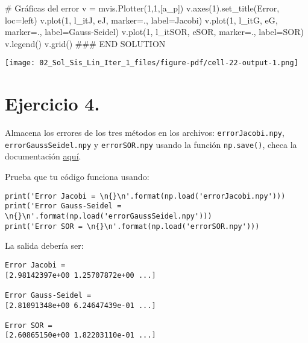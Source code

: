 \documentclass[
  letterpaper,
  DIV=11,
  numbers=noendperiod]{scrreprt}
\newenvironment{Shaded}{\begin{snugshade}}{\end{snugshade}}
\newcommand{\CommentTok}[1]{\textcolor[rgb]{0.37,0.37,0.37}{#1}}
\newcommand{\DecValTok}[1]{\textcolor[rgb]{0.68,0.00,0.00}{#1}}
\newcommand{\NormalTok}[1]{\textcolor[rgb]{0.00,0.23,0.31}{#1}}
\newcommand{\OperatorTok}[1]{\textcolor[rgb]{0.37,0.37,0.37}{#1}}
\newcommand{\RegionMarkerTok}[1]{\textcolor[rgb]{0.00,0.23,0.31}{#1}}
\newcommand{\StringTok}[1]{\textcolor[rgb]{0.13,0.47,0.30}{#1}}
\begin{document}
\begin{Shaded}
\begin{Highlighting}[]
\CommentTok{\# Gráficas del error}
\NormalTok{v }\OperatorTok{=}\NormalTok{ mvis.Plotter(}\DecValTok{1}\NormalTok{,}\DecValTok{1}\NormalTok{,[a\_p]) }
\NormalTok{v.axes(}\DecValTok{1}\NormalTok{).set\_title(}\StringTok{\textquotesingle{}Error\textquotesingle{}}\NormalTok{, loc}\OperatorTok{=}\StringTok{\textquotesingle{}left\textquotesingle{}}\NormalTok{)}
\NormalTok{v.plot(}\DecValTok{1}\NormalTok{, l\_itJ, eJ, marker}\OperatorTok{=}\StringTok{\textquotesingle{}.\textquotesingle{}}\NormalTok{, label}\OperatorTok{=}\StringTok{\textquotesingle{}Jacobi\textquotesingle{}}\NormalTok{)}
\NormalTok{v.plot(}\DecValTok{1}\NormalTok{, l\_itG, eG, marker}\OperatorTok{=}\StringTok{\textquotesingle{}.\textquotesingle{}}\NormalTok{, label}\OperatorTok{=}\StringTok{\textquotesingle{}Gauss{-}Seidel\textquotesingle{}}\NormalTok{)}
\NormalTok{v.plot(}\DecValTok{1}\NormalTok{, l\_itSOR, eSOR, marker}\OperatorTok{=}\StringTok{\textquotesingle{}.\textquotesingle{}}\NormalTok{, label}\OperatorTok{=}\StringTok{\textquotesingle{}SOR\textquotesingle{}}\NormalTok{)}
\NormalTok{v.legend()}
\NormalTok{v.grid()}
\CommentTok{\#\#\# }\RegionMarkerTok{END}\CommentTok{ SOLUTION}
\end{Highlighting}
\end{Shaded}

\texttt{[image: 02\_Sol\_Sis\_Lin\_Iter\_1\_files/figure-pdf/cell-22-output-1.png]}

\section{\texorpdfstring{\textbf{Ejercicio
4.}}{Ejercicio 4.}}\label{ejercicio-4.}

Almacena los errores de los tres métodos en los archivos:
\texttt{errorJacobi.npy}, \texttt{errorGaussSeidel.npy} y
\texttt{errorSOR.npy} usando la función \texttt{np.save()}, checa la
documentación
\href{https://numpy.org/doc/stable/reference/generated/numpy.save.html}{aquí}.

Prueba que tu código funciona usando:

\begin{verbatim}
print('Error Jacobi = \n{}\n'.format(np.load('errorJacobi.npy')))
print('Error Gauss-Seidel = \n{}\n'.format(np.load('errorGaussSeidel.npy')))
print('Error SOR = \n{}\n'.format(np.load('errorSOR.npy')))
\end{verbatim}

La salida debería ser:

\begin{verbatim}
Error Jacobi = 
[2.98142397e+00 1.25707872e+00 ...]

Error Gauss-Seidel = 
[2.81091348e+00 6.24647439e-01 ...]

Error SOR = 
[2.60865150e+00 1.82203110e-01 ...]
\end{verbatim}
\end{document}
